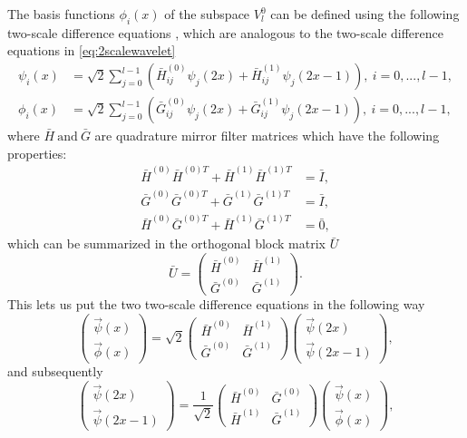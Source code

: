 \documentclass[../Thesis.tex]{subfiles}
\begin{document}
 The basis functions $\phi_i(x)$ of the subspace $V_l^0$ can be defined using the following two-scale
difference equations \cite{Beylkin1999AdaptiveSO}, which are analogous to the
two-scale difference equations in \ref{eq:2scalewavelet}
\begin{align}
  \psi_i(x) &= \sqrt{2}\sum^{l-1}_{j=0}\left(\bar{H}^{(0)}_{ij}\psi_j(2x) + \bar{H}^{(1)}_{ij}\psi_j(2x-1)\right), \ i = 0,...,l-1, \\
  \phi_i(x) &= \sqrt{2}\sum^{l-1}_{j=0}\left(\bar{G}^{(0)}_{ij}\psi_j(2x) + \bar{G}^{(1)}_{ij}\psi_j(2x-1)\right), \ i = 0,...,l-1,
\end{align}
where $ \bar{H} \ \text{and}\ \bar{G} $ are quadrature mirror filter matrices \cite{Beylkin1999AdaptiveSO} which have
the following properties:
\begin{align}
  \bar{H}^{(0)}\bar{H}^{(0)T} + \bar{H}^{(1)}\bar{H}^{(1)T} &= \bar{I}, \\
  \bar{G}^{(0)}\bar{G}^{(0)T} + \bar{G}^{(1)}\bar{G}^{(1)T} &= \bar{I}, \\
  \bar{H}^{(0)}\bar{G}^{(0)T} + \bar{H}^{(1)}\bar{G}^{(1)T} &= \bar{0},
\end{align}
which can be summarized in the orthogonal block matrix $\bar{U}$ \cite{Beylkin1999AdaptiveSO}
\begin{equation}
  \bar{U} =
  \begin{pmatrix}
    \bar{H}^{(0)} & \bar{H}^{(1)} \\
    \bar{G}^{(0)} & \bar{G}^{(1)}
  \end{pmatrix}.
\end{equation}
This lets us put the two two-scale difference equations in the following way \cite{Sorland}
\begin{equation}
  \begin{pmatrix}
    \vec{\psi}(x) \\
    \vec{\phi}(x)
  \end{pmatrix}
  = \sqrt{2}
  \begin{pmatrix}
    \bar{H}^{(0)} & \bar{H}^{(1)} \\
    \bar{G}^{(0)} & \bar{G}^{(1)}
  \end{pmatrix}
  \begin{pmatrix}
    \vec{\psi}(2x) \\
    \vec{\psi}(2x-1)
  \end{pmatrix},
\end{equation}
and subsequently
\begin{equation}
  \begin{pmatrix}
    \vec{\psi}(2x) \\
    \vec{\psi}(2x-1)
  \end{pmatrix}
  = \frac{1}{\sqrt{2}}
  \begin{pmatrix}
    \bar{H}^{(0)} & \bar{G}^{(0)} \\
    \bar{H}^{(1)} & \bar{G}^{(1)}
  \end{pmatrix}
  \begin{pmatrix}
    \vec{\psi}(x) \\
    \vec{\phi}(x)
  \end{pmatrix},
\end{equation}
\end{document}

